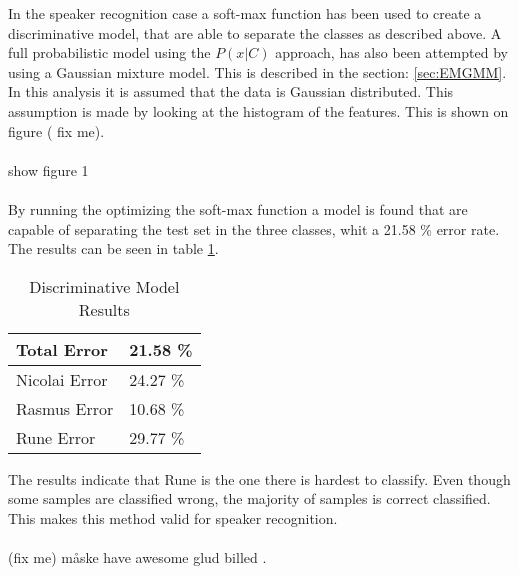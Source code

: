 In the speaker recognition case a soft-max function has been used to create a discriminative model, that are able to separate the classes as described above. A full probabilistic model using the $P(x|C)$ approach, has also been attempted by using a Gaussian mixture model. This is described in the section: \ref{sec:EMGMM}. In this analysis it is assumed that the data is Gaussian distributed. This assumption is made by looking at the histogram of the features. This is shown on figure ( fix me).\\\\

show figure 1\\\\

By running the optimizing the soft-max function a model is found that are capable of separating the test set in the three classes, whit a 21.58 \% error rate. The results can be seen in table \ref{tab:resultTableProp}. 

\begin{table}[h]
\centering
\begin{tabular}{ll}
\hline
Total Error   & 21.58 \% \\ \hline
Nicolai Error & 24.27 \% \\
Rasmus Error  & 10.68 \% \\
Rune Error    & 29.77 \% \\ \hline
\end{tabular}
\caption{Discriminative Model Results}
\label{tab:resultTableProp}
\end{table}

The results indicate that Rune is the one there is hardest to classify. Even though some samples are classified wrong, the majority of samples is correct classified. This makes this method valid for speaker recognition. \\\\

(fix me) måske have awesome glud billed .

